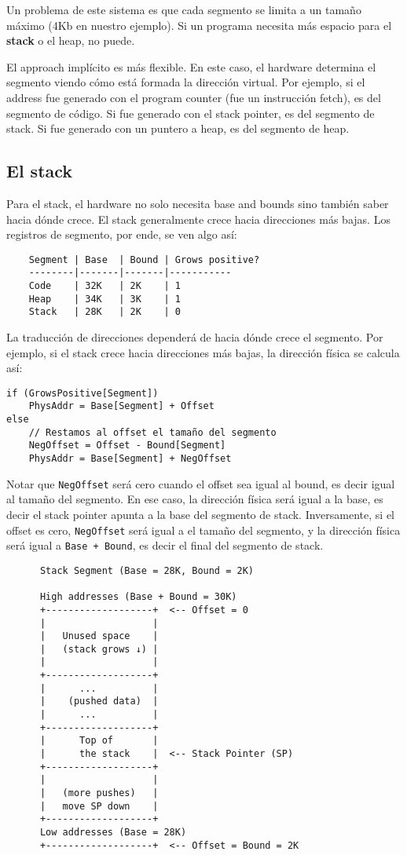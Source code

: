 \documentclass[12pt]{article}
\theoremstyle{definition}
\begin{document}
Un problema de este sistema es que cada segmento se limita a un tamaño máximo
(4Kb en nuestro ejemplo). Si un programa necesita más espacio para el
\textbf{stack} o el heap, no puede. 

El approach implícito es más flexible. En este caso, el hardware determina el
segmento viendo cómo está formada la dirección virtual. Por ejemplo, si el
address fue generado con el program counter (fue un instrucción fetch), es del
segmento de código. Si fue generado con el stack pointer, es del segmento de
stack. Si fue generado con un puntero a heap, es del segmento de heap.

\subsection{El stack}

Para el stack, el hardware no solo necesita base and bounds sino también saber
hacia dónde crece. El stack generalmente crece hacia direcciones más bajas. Los
registros de segmento, por ende, se ven algo así: 

\begin{verbatim}
    Segment | Base  | Bound | Grows positive?
    --------|-------|-------|-----------
    Code    | 32K   | 2K    | 1
    Heap    | 34K   | 3K    | 1
    Stack   | 28K   | 2K    | 0
\end{verbatim}

La traducción de direcciones dependerá de hacia dónde crece el segmento.  
Por ejemplo, si el stack crece hacia direcciones más bajas, la dirección
física se calcula así:

\footnotesize
\begin{verbatim}
if (GrowsPositive[Segment])
    PhysAddr = Base[Segment] + Offset
else 
    // Restamos al offset el tamaño del segmento
    NegOffset = Offset - Bound[Segment] 
    PhysAddr = Base[Segment] + NegOffset
\end{verbatim}
\normalsize

Notar que \texttt{NegOffset} será cero cuando el offset sea igual al bound, es
decir igual al tamaño del segmento. En ese caso, la dirección física será igual
a la base, es decir el stack pointer apunta a la base del segmento de stack.
Inversamente, si el offset es cero, \texttt{NegOffset} será igual a el tamaño
del segmento, y la dirección física será igual a \texttt{Base + Bound}, es decir
el final del segmento de stack.


\begin{verbatim}
      Stack Segment (Base = 28K, Bound = 2K)

      High addresses (Base + Bound = 30K)
      +-------------------+  <-- Offset = 0
      |                   |  
      |   Unused space    |
      |   (stack grows ↓) |
      |                   |
      +-------------------+
      |      ...          |
      |    (pushed data)  |
      |      ...          |
      +-------------------+
      |      Top of       |
      |      the stack    |  <-- Stack Pointer (SP)
      +-------------------+
      |                   |
      |   (more pushes)   |
      |   move SP down    |
      +-------------------+
      Low addresses (Base = 28K)
      +-------------------+  <-- Offset = Bound = 2K
\end{verbatim}
\end{document}
